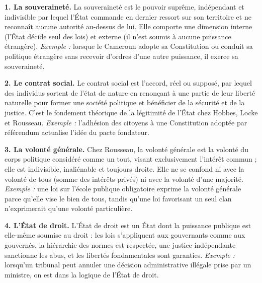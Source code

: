 \documentclass[11pt]{article}
\begin{document}
\begin{corrige}

\textbf{1. La souveraineté.} La souveraineté est le pouvoir suprême, indépendant et indivisible par lequel l'État commande en dernier ressort sur son territoire et ne reconnaît aucune autorité au-dessus de lui. Elle comporte une dimension interne (l'État décide seul des lois) et externe (il n'est soumis à aucune puissance étrangère). \emph{Exemple :} lorsque le Cameroun adopte sa Constitution ou conduit sa politique étrangère sans recevoir d'ordres d'une autre puissance, il exerce sa souveraineté.

\textbf{2. Le contrat social.} Le contrat social est l'accord, réel ou supposé, par lequel des individus sortent de l'état de nature en renonçant à une partie de leur liberté naturelle pour former une société politique et bénéficier de la sécurité et de la justice. C'est le fondement théorique de la légitimité de l'État chez Hobbes, Locke et Rousseau. \emph{Exemple :} l'adhésion des citoyens à une Constitution adoptée par référendum actualise l'idée du pacte fondateur.

\textbf{3. La volonté générale.} Chez Rousseau, la volonté générale est la volonté du corps politique considéré comme un tout, visant exclusivement l'intérêt commun ; elle est indivisible, inaliénable et toujours droite. Elle ne se confond ni avec la volonté de tous (somme des intérêts privés) ni avec la volonté d'une majorité. \emph{Exemple :} une loi sur l'école publique obligatoire exprime la volonté générale parce qu'elle vise le bien de tous, tandis qu'une loi favorisant un seul clan n'exprimerait qu'une volonté particulière.

\textbf{4. L'État de droit.} L'État de droit est un État dont la puissance publique est elle-même soumise au droit : les lois s'appliquent aux gouvernants comme aux gouvernés, la hiérarchie des normes est respectée, une justice indépendante sanctionne les abus, et les libertés fondamentales sont garanties. \emph{Exemple :} lorsqu'un tribunal peut annuler une décision administrative illégale prise par un ministre, on est dans la logique de l'État de droit.

\end{corrige}
\end{document}
